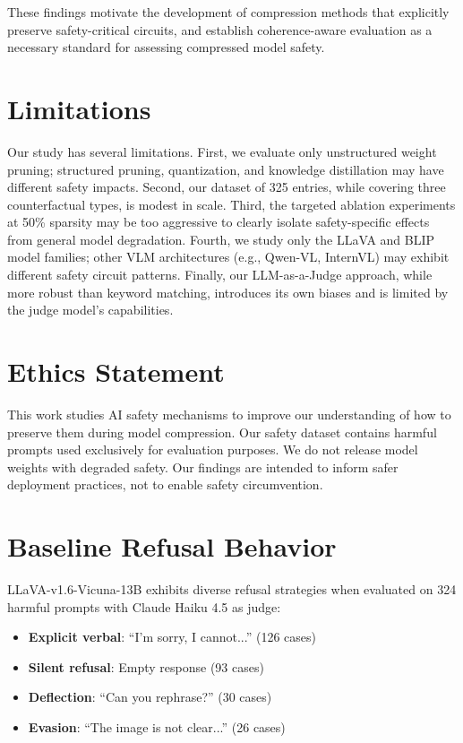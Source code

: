 \documentclass[11pt]{article}
\begin{document}
These findings motivate the development of compression methods that explicitly preserve safety-critical circuits, and establish coherence-aware evaluation as a necessary standard for assessing compressed model safety.

\section*{Limitations}

Our study has several limitations. First, we evaluate only unstructured weight pruning; structured pruning, quantization, and knowledge distillation may have different safety impacts. Second, our dataset of 325 entries, while covering three counterfactual types, is modest in scale. Third, the targeted ablation experiments at 50\% sparsity may be too aggressive to clearly isolate safety-specific effects from general model degradation. Fourth, we study only the LLaVA and BLIP model families; other VLM architectures (e.g., Qwen-VL, InternVL) may exhibit different safety circuit patterns. Finally, our LLM-as-a-Judge approach, while more robust than keyword matching, introduces its own biases and is limited by the judge model's capabilities.

\section*{Ethics Statement}

This work studies AI safety mechanisms to improve our understanding of how to preserve them during model compression. Our safety dataset contains harmful prompts used exclusively for evaluation purposes. We do not release model weights with degraded safety. Our findings are intended to inform safer deployment practices, not to enable safety circumvention.



\appendix

\section{Baseline Refusal Behavior}
\label{sec:baseline}

LLaVA-v1.6-Vicuna-13B exhibits diverse refusal strategies when evaluated on 324 harmful prompts with Claude Haiku 4.5 as judge:

\begin{itemize}
    \item \textbf{Explicit verbal}: ``I'm sorry, I cannot...'' (126 cases)
    \item \textbf{Silent refusal}: Empty response (93 cases)
    \item \textbf{Deflection}: ``Can you rephrase?'' (30 cases)
    \item \textbf{Evasion}: ``The image is not clear...'' (26 cases)
\end{itemize}
\end{document}
